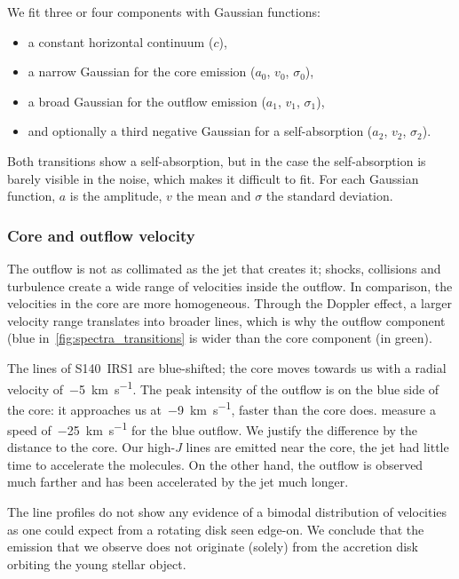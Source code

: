 \begin{samepage}
We fit three or four components with Gaussian functions:
\begin{itemize}[noitemsep,nolistsep]
    \item a constant horizontal continuum ($c$),
    \item a narrow Gaussian for the core emission ($a_0$, $v_0$, $\sigma_0$),
    \item a broad Gaussian for the outflow emission ($a_1$, $v_1$, $\sigma_1$),
    \item and optionally a third negative Gaussian for a self-absorption
     ($a_2$, $v_2$, $\sigma_2$).
\end{itemize}
\end{samepage}
Both transitions show a self-absorption, but in the case  the self-absorption is barely visible in the noise, which makes it difficult to fit.
For each Gaussian function, $a$ is the amplitude, $v$ the mean and $\sigma$ the standard deviation.

\subsubsection{Core and outflow velocity}
The outflow is not as collimated as the jet that creates it; shocks, collisions and turbulence create a wide range of velocities inside the outflow.
In comparison, the velocities in the core are more homogeneous.
Through the Doppler effect, a larger velocity range translates into broader lines, which is why the outflow component (blue in~\cref{fig:spectra_transitions} is wider than the core component (in green).

The  lines of S140~IRS1 are blue-shifted;
the core moves towards us with a radial velocity of~\SI{-5}{\kilo\meter\per\second}.
The peak intensity of the outflow is on the blue side of the core: it approaches us at~\SI{-9}{\kilo\meter\per\second}, faster than the core does.
\Textcite{maud2013s140} measure a speed of~\SI{-25}{\kilo\meter\per\second} for the blue  outflow.
We justify the difference by the distance to the core.
Our high-$J$ lines are emitted near the core, the jet had little time to accelerate the  molecules.
On the other hand, the  outflow is observed much farther and has been accelerated by the jet much longer.

The line profiles do not show any evidence of a bimodal distribution of velocities as one could expect from a rotating disk seen edge-on.
We conclude that the emission that we observe does not originate (solely) from the accretion disk orbiting the young stellar object.


